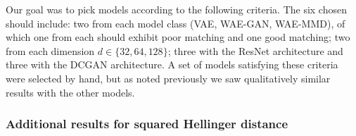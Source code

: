 Our goal was to pick models according to the following criteria. 
The six chosen should include: two from each model class (VAE, WAE-GAN, WAE-MMD), of which one from each should exhibit poor matching and one good matching; two from each dimension $d\in\{32, 64, 128\}$; three with the ResNet architecture and three with the DCGAN architecture.
A set of models satisfying these criteria were selected by hand, but as noted previously we saw qualitatively similar results with the other models.

\subsubsection{Additional results for squared Hellinger distance}\label{appendix:sq-hellinger-results}





